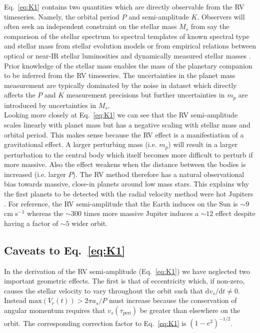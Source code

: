 Eq.~\ref{eq:K1} contains two quantities which are directly observable from the RV timeseries.
Namely, the orbital period $P$ and semi-amplitude $K$. Observers will often seek an independent
constraint on the stellar mass $M_s$ from say the comparison of the stellar spectrum to
spectral templates of known spectral type and stellar mass from stellar evolution models
\citep[e.g.][]{muirhead12} or from
empirical relations between optical or near-IR stellar luminosities and dynamically
measured stellar masses \citep[e.g.][]{benedict16,mann19}. Prior knowledge of the
stellar mass enables the mass of the planetary companion to be inferred from the RV timeseries.
The uncertainties in the planet mass 
measurement are typically dominated by the noise in dataset which directly affects the
$P$ and $K$ measurement precisions but further uncertainties in $m_p$ are introduced by
uncertainties in $M_s$. \\

Looking more closely at Eq.~\ref{eq:K1} we can see that the RV semi-amplitude scales 
linearly with planet mass but has a negative scaling with stellar mass and orbital 
period. This makes sense because the RV effect is a manifestiation of a gravitational effect.
A larger perturbing mass (i.e. $m_p$) will result in a larger perturbation to the 
central body which itself becomes more difficult to perturb if more massive. Also the 
effect weakens when the distance between the bodies is increased (i.e. larger $P$). The 
RV method therefore has a natural observational bias towards massive, 
close-in planets around low mass stars. This explains why the first planets to be 
detected with the radial velocity method were hot Jupiters 
\citep[e.g.][]{mayor95}. For reference, the RV semi-amplitude that the Earth 
induces on the Sun is $\sim 9$ cm s$^{-1}$ whereas the $\sim 300$ times more massive Jupiter
induces a $\sim 12$ \mps{} effect despite having a factor of $\sim 5$ wider orbit.

\subsection{Caveats to Eq.~\ref{eq:K1}}
In the derivation of the RV semi-amplitude (Eq.~\ref{eq:K1}) we have neglected two 
important geometric effects. The first is that of eccentricity which, if non-zero, 
causes the stellar velocity to vary throughout the orbit such that
$\text{d}v_s/\text{d}t \ne 0$. Instead $\mathrm{max}(V_r(t)) > 2\pi a_s/P$ must increase
because the conservation of angular momentum requires that $v_s(\tau_{\text{peri}})$ 
be greater than elsewhere on the orbit. The corresponding correction 
factor to Eq.~\ref{eq:K1} is $(1-e^2)^{-1/2}$. \\

